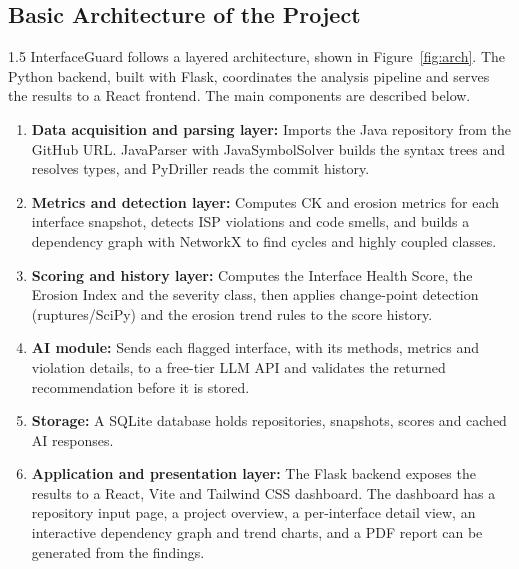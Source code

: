 \documentclass[12pt,a4paper]{article}
\begin{document}
\subsection{Basic Architecture of the Project}

\begin{spacing}{1.5}
\justifying
InterfaceGuard follows a layered architecture, shown in Figure~\ref{fig:arch}.
The Python backend, built with Flask, coordinates the analysis pipeline
and serves the results to a React frontend. The main components are
described below.

\begin{enumerate}[leftmargin=*,itemsep=2pt]
  \item \textbf{Data acquisition and parsing layer:} Imports the Java
        repository from the GitHub URL. JavaParser with JavaSymbolSolver
        builds the syntax trees and resolves types, and PyDriller reads
        the commit history.

  \item \textbf{Metrics and detection layer:} Computes CK and erosion
        metrics for each interface snapshot, detects ISP violations and
        code smells, and builds a dependency graph with NetworkX to find
        cycles and highly coupled classes.

  \item \textbf{Scoring and history layer:} Computes the Interface Health
        Score, the Erosion Index and the severity class, then applies
        change-point detection (ruptures/SciPy) and the erosion trend
        rules to the score history.

  \item \textbf{AI module:} Sends each flagged interface, with its methods,
        metrics and violation details, to a free-tier LLM API and validates
        the returned recommendation before it is stored.

  \item \textbf{Storage:} A SQLite database holds repositories, snapshots,
        scores and cached AI responses.

  \item \textbf{Application and presentation layer:} The Flask backend
        exposes the results to a React, Vite and Tailwind CSS dashboard.
        The dashboard has a repository input page, a project overview,
        a per-interface detail view, an interactive dependency graph and
        trend charts, and a PDF report can be generated from the findings.
\end{enumerate}
\end{spacing}
\end{document}
